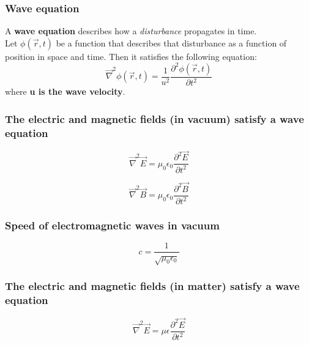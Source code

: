 \documentclass[english,11pt]{article}
\begin{document}
\subsubsection*{\bf Wave equation}

A {\bf wave equation} describes how a {\em disturbance} propagates in time.\\

Let $\phi(\vec{r}, t)$ be a function that describes that disturbance as a function of position in space and time.
Then it satisfies the following equation:
\begin{equation*}
   \vec{\nabla}^{2} \phi(\vec{r}, t) = \frac{1}{u^2} \frac{\partial^{2} \phi(\vec{r}, t)} {\partial t^{2}}
\end{equation*}
where {\bf u is the wave velocity}.\\


\subsubsection*{\bf The electric and magnetic fields (in vacuum) satisfy a wave equation}

\begin{equation*}
  \vec{\nabla}^{2} \vec{E} = \mu_0 \epsilon_0 \frac{\partial^{2} \vec{E}}{\partial t^{2}}
\end{equation*}

\begin{equation*}
  \vec{\nabla}^{2} \vec{B} = \mu_0 \epsilon_0 \frac{\partial^{2} \vec{B}}{\partial t^{2}}
\end{equation*}

\subsubsection*{\bf Speed of electromagnetic waves in vacuum}
\begin{equation*}
  c = \frac{1}{\sqrt{\mu_0 \epsilon_0}}
\end{equation*}


\subsubsection*{\bf The electric and magnetic fields (in matter) satisfy a wave equation}

\begin{equation*}
  \vec{\nabla}^{2} \vec{E} = \mu \epsilon \frac{\partial^{2} \vec{E}}{\partial t^{2}}
\end{equation*}
\end{document}
